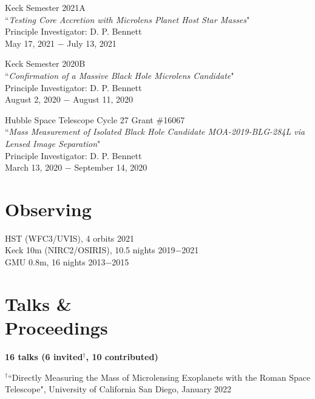 \documentclass[margin,line]{cv}
\begin{document}
\begin{resume}
Keck Semester 2021A \\
``\textit{Testing Core Accretion with Microlens Planet Host Star Masses}" \\
Principle Investigator: D. P. Bennett\\
May 17, 2021 $-$ July 13, 2021

Keck Semester 2020B \\
``\textit{Confirmation of a Massive Black Hole Microlens Candidate}" \\
Principle Investigator: D. P. Bennett\\
August 2, 2020 $-$ August 11, 2020

Hubble Space Telescope Cycle 27 Grant \#16067 \\
``\textit{Mass Measurement of Isolated Black Hole Candidate MOA-2019-BLG-284L via Lensed Image Separation}" \\
Principle Investigator: D. P. Bennett \\
March 13, 2020 $-$ September 14, 2020

\section{\sc Observing}
HST (WFC3/UVIS), 4 orbits \hfill 2021\\
Keck 10m (NIRC2/OSIRIS), 10.5 nights \hfill 2019$-$2021\\
GMU 0.8m, 16 nights \hfill 2013$-$2015 \\

\section{\sc Talks \&\\ Proceedings}
\textbf{16 talks (6 invited$^{\dagger}$, 10 contributed)}\\
\begin{etaremune}

\item $^{\dagger}$``Directly Measuring the Mass of Microlensing Exoplanets with the Roman Space
Telescope", University of California San Diego, January 2022


\end{etaremune}
\end{resume}
\end{document}
